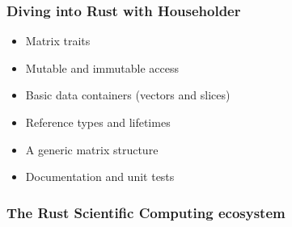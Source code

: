 \documentclass[dvipsnames,10pt]{beamer}
\begin{document}
\begin{frame}
\frametitle{Diving into Rust with Householder}

\begin{itemize}
\item Matrix traits
\item Mutable and immutable access
\item Basic data containers (vectors and slices)
\item Reference types and lifetimes
\item A generic matrix structure
\item Documentation and unit tests
\end{itemize}

\end{frame}

\begin{frame}
\frametitle{The Rust Scientific Computing ecosystem}

{\tiny

}
\end{frame}
\end{document}
